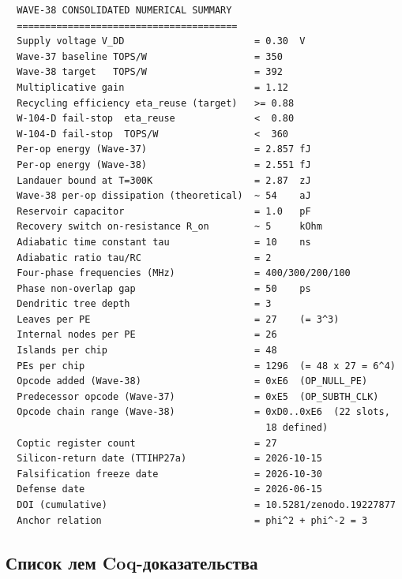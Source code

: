 \begin{verbatim}
  WAVE-38 CONSOLIDATED NUMERICAL SUMMARY
  =======================================
  Supply voltage V_DD                       = 0.30  V
  Wave-37 baseline TOPS/W                   = 350
  Wave-38 target   TOPS/W                   = 392
  Multiplicative gain                       = 1.12
  Recycling efficiency eta_reuse (target)   >= 0.88
  W-104-D fail-stop  eta_reuse              <  0.80
  W-104-D fail-stop  TOPS/W                 <  360
  Per-op energy (Wave-37)                   = 2.857 fJ
  Per-op energy (Wave-38)                   = 2.551 fJ
  Landauer bound at T=300K                  = 2.87  zJ
  Wave-38 per-op dissipation (theoretical)  ~ 54    aJ
  Reservoir capacitor                       = 1.0   pF
  Recovery switch on-resistance R_on        ~ 5     kOhm
  Adiabatic time constant tau               = 10    ns
  Adiabatic ratio tau/RC                    = 2
  Four-phase frequencies (MHz)              = 400/300/200/100
  Phase non-overlap gap                     = 50    ps
  Dendritic tree depth                      = 3
  Leaves per PE                             = 27    (= 3^3)
  Internal nodes per PE                     = 26
  Islands per chip                          = 48
  PEs per chip                              = 1296  (= 48 x 27 = 6^4)
  Opcode added (Wave-38)                    = 0xE6  (OP_NULL_PE)
  Predecessor opcode (Wave-37)              = 0xE5  (OP_SUBTH_CLK)
  Opcode chain range (Wave-38)              = 0xD0..0xE6  (22 slots,
                                              18 defined)
  Coptic register count                     = 27
  Silicon-return date (TTIHP27a)            = 2026-10-15
  Falsification freeze date                 = 2026-10-30
  Defense date                              = 2026-06-15
  DOI (cumulative)                          = 10.5281/zenodo.19227877
  Anchor relation                           = phi^2 + phi^-2 = 3
\end{verbatim}

\subsection{Список лем Coq-доказательства}
\label{subsec:coq_lemma_list}

